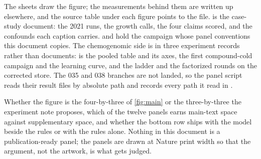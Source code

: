  The sheets draw the figure; the measurements behind
them are written up elsewhere, and the source table under each figure points to the file.
 is the case-study document: the
2021 runs, the growth calls, the four claims scored, and the confounds each caption
carries.  and
 hold the campaign whose panel
conventions this document copies. The chemogenomic side is in three experiment records
rather than documents:  is the pooled table and
its axes,  the first compound-cold
campaign and the learning curve, and
 the ladder and the factorized
rounds on the corrected store. The 035 and 038 branches are not landed, so the panel
script reads their result files by absolute path and records every path it read in
.

 Whether the figure is the four-by-three of
\cref{fig:main} or the three-by-three the experiment note proposes, which of the twelve
panels earns main-text space against supplementary space, and whether the bottom row
ships with the model beside the rules or with the rules alone. Nothing in this document
is a publication-ready panel; the panels are drawn at Nature print width so that the
argument, not the artwork, is what gets judged.

